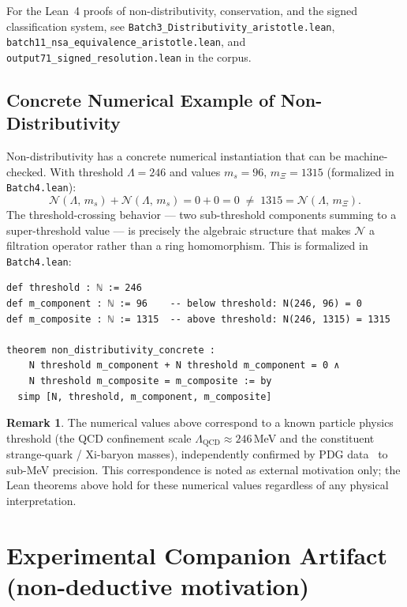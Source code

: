 \documentclass[12pt, a4paper]{article}
\theoremstyle{plain}
\theoremstyle{definition}
\newtheorem{remark}[theorem]{Remark}
\newcommand{\N}{\mathcal{N}}
\newcommand{\lean}[1]{\texttt{#1}}
\begin{document}
For the Lean~4 proofs of non-distributivity, conservation, and the
signed classification system, see
\lean{Batch3\_Distributivity\_aristotle.lean},
\lean{batch11\_nsa\_equivalence\_aristotle.lean}, and
\lean{output71\_signed\_resolution.lean} in the corpus.

\subsection{Concrete Numerical Example of Non-Distributivity}
\label{app:xi}

Non-distributivity has a concrete numerical instantiation that can be
machine-checked.
With threshold $\Lambda = 246$ and values $m_s = 96$, $m_\Xi = 1315$
(formalized in \lean{Batch4.lean}):
\[
  \N(\Lambda,\, m_s) + \N(\Lambda,\, m_s) = 0 + 0 = 0
  \;\neq\; 1315 = \N(\Lambda,\, m_\Xi).
\]
The threshold-crossing behavior --- two sub-threshold components summing to
a super-threshold value --- is precisely the algebraic structure that makes
$\N$ a filtration operator rather than a ring homomorphism.
This is formalized in \lean{Batch4.lean}:

\begin{lstlisting}[language=Lean4]
def threshold : ℕ := 246
def m_component : ℕ := 96    -- below threshold: N(246, 96) = 0
def m_composite : ℕ := 1315  -- above threshold: N(246, 1315) = 1315

theorem non_distributivity_concrete :
    N threshold m_component + N threshold m_component = 0 ∧
    N threshold m_composite = m_composite := by
  simp [N, threshold, m_component, m_composite]
\end{lstlisting}

\begin{remark}
The numerical values above correspond to a known particle physics threshold
(the QCD confinement scale $\Lambda_\text{QCD} \approx 246$\,MeV and
the constituent strange-quark / Xi-baryon masses), independently confirmed
by PDG data~\cite{pdg2024} to sub-MeV precision.
This correspondence is noted as external motivation only; the Lean
theorems above hold for these numerical values regardless of any physical
interpretation.
\end{remark}

\section{Experimental Companion Artifact (non-deductive motivation)}
\label{app:experimental}
\end{document}
